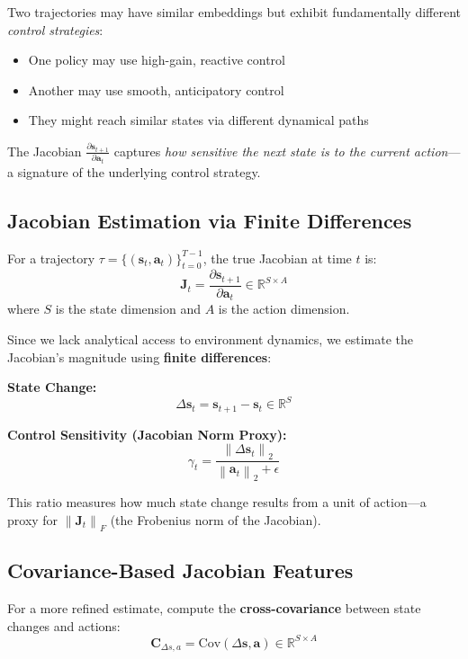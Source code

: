 \documentclass[11pt,a4paper]{article}
\newcommand{\vect}[1]{\mathbf{#1}}
\newcommand{\mat}[1]{\mathbf{#1}}
\newcommand{\norm}[1]{\left\|#1\right\|}
\newcommand{\R}{\mathbb{R}}
\begin{document}
Two trajectories may have similar embeddings but exhibit fundamentally different \textit{control strategies}:
\begin{itemize}
    \item One policy may use high-gain, reactive control
    \item Another may use smooth, anticipatory control
    \item They might reach similar states via different dynamical paths
\end{itemize}

The Jacobian $\frac{\partial \vect{s}_{t+1}}{\partial \vect{a}_t}$ captures \textit{how sensitive the next state is to the current action}---a signature of the underlying control strategy.

\subsection{Jacobian Estimation via Finite Differences}

For a trajectory $\tau = \{(\vect{s}_t, \vect{a}_t)\}_{t=0}^{T-1}$, the true Jacobian at time $t$ is:
\begin{equation}
    \mat{J}_t = \frac{\partial \vect{s}_{t+1}}{\partial \vect{a}_t} \in \R^{S \times A}
\end{equation}
where $S$ is the state dimension and $A$ is the action dimension.

Since we lack analytical access to environment dynamics, we estimate the Jacobian's magnitude using \textbf{finite differences}:

\textbf{State Change:}
\begin{equation}
    \Delta \vect{s}_t = \vect{s}_{t+1} - \vect{s}_t \in \R^S
\end{equation}

\textbf{Control Sensitivity (Jacobian Norm Proxy):}
\begin{equation}
    \gamma_t = \frac{\norm{\Delta \vect{s}_t}_2}{\norm{\vect{a}_t}_2 + \epsilon}
\end{equation}

This ratio measures how much state change results from a unit of action---a proxy for $\norm{\mat{J}_t}_F$ (the Frobenius norm of the Jacobian).

\subsection{Covariance-Based Jacobian Features}

For a more refined estimate, compute the \textbf{cross-covariance} between state changes and actions:
\begin{equation}
    \mat{C}_{\Delta s, a} = \text{Cov}(\Delta \vect{s}, \vect{a}) \in \R^{S \times A}
\end{equation}
\end{document}
